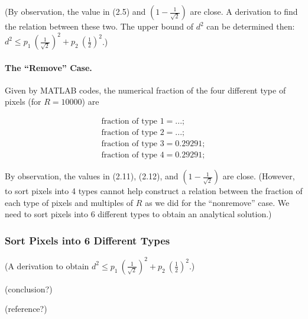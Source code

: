 \documentclass[letterpaper]{article}
\numberwithin{equation}{section} %
\numberwithin{figure}{section} %
\numberwithin{table}{section} %
\begin{document}
(By observation, the value in (2.5) and $(1-\frac{1}{\sqrt{2}})$ are close. A derivation to find the relation between these two. The upper bound of $d^2$ can be determined then: $d^2 \leq p_1 \ (\frac{1}{\sqrt{2}})^2 + p_2 \ (\frac{1}{2})^2 $.)

\paragraph{The \enquote{Remove} Case.}
	
Given by MATLAB codes, the numerical fraction of the four different type of pixels (for $R=10000$) are 

\begin{align} 
\text{fraction of type 1}=...; \\
\text{fraction of type 2}=...; \\
\text{fraction of type 3}=0.29291; \\
\text{fraction of type 4}=0.29291; 
\end{align}

By observation, the values in (2.11), (2.12), and $(1-\frac{1}{\sqrt{2}})$ are close. (However, to sort pixels into 4 types cannot help construct a relation between the fraction of each type of pixels and multiples of $R$ as we did for the \enquote{nonremove} case. We need to sort pixels into 6 different types to obtain an analytical solution.)

\subsubsection{Sort Pixels into 6 Different Types}

(A derivation to obtain $d^2 \leq p_1 \ (\frac{1}{\sqrt{2}})^2 + p_2 \ (\frac{1}{2})^2 $.)

(conclusion?)

(reference?)
\end{document}

